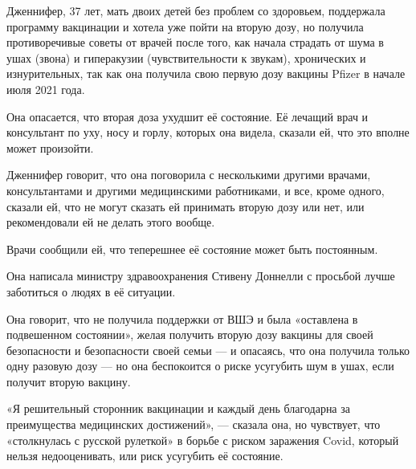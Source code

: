 Дженнифер, 37 лет, мать двоих детей без проблем со здоровьем, поддержала
программу вакцинации и хотела уже пойти на вторую дозу, но получила
противоречивые советы от врачей после того, как начала страдать от шума в ушах
(звона) и гиперакузии (чувствительности к звукам), хронических и изнурительных,
так как она получила свою первую дозу вакцины Pfizer в начале июля 2021 года.

Она опасается, что вторая доза ухудшит её состояние. Её лечащий врач и
консультант по уху, носу и горлу, которых она видела, сказали ей, что это вполне
может произойти.

Дженнифер говорит, что она поговорила с несколькими другими врачами,
консультантами и другими медицинскими работниками, и все, кроме одного, сказали
ей, что не могут сказать ей принимать вторую дозу или нет, или рекомендовали ей
не делать этого вообще.

Врачи сообщили ей, что теперешнее её состояние может быть постоянным.

Она написала министру здравоохранения Стивену Доннелли с просьбой лучше
заботиться о людях в её ситуации.

Она говорит, что не получила поддержки от ВШЭ и была «оставлена в подвешенном
состоянии», желая получить вторую дозу вакцины для своей безопасности и
безопасности своей семьи — и опасаясь, что она получила только одну разовую дозу
— но она беспокоится о риске усугубить шум в ушах, если получит вторую вакцину.

«Я решительный сторонник вакцинации и каждый день благодарна за преимущества
медицинских достижений», — сказала она, но чувствует, что «столкнулась с русской
рулеткой» в борьбе с риском заражения Covid, который нельзя недооценивать, или
риск усугубить её состояние.
